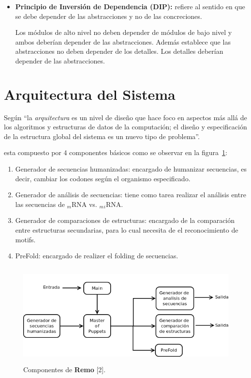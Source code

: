 \begin{itemize}
	\item \textbf{Principio de Inversión de Dependencia (DIP):} refiere al sentido en que se debe depender de las abstracciones y no de las concreciones.
	\par Los módulos de alto nivel no deben depender de módulos de bajo nivel y ambos deberían depender de las abstracciones. Además establece que las abstracciones no deben depender de los detalles. Los detalles deberían depender de las abstracciones. 
\end{itemize}

\section{Arquitectura del Sistema}
\par Según \cite{arquitecturaSistema} ``la \emph{arquitectura} es un nivel de diseño que hace foco en aspectos más allá de los algoritmos y estructuras de datos de la computación; el diseño y especificación de la estructura global del sistema es un nuevo tipo de problema''.

\par \remo esta compuesto por 4 componentes básicos como se observar en la figura~\ref{componentesBasicos}:

\begin{enumerate}
	\item Generador de secuencias humanizadas: encargado de humanizar secuencias, es decir, cambiar los codones según el organismo especificado.

	\item Generador de análisis de secuencias: tiene como tarea realizar el análisis entre las secuencias de $_m$RNA vs. $_m$$_i$RNA.

	\item Generador de comparaciones de estructuras: encargado de la comparación entre estructuras secundarias, para lo cual necesita de el reconocimiento de motifs.

	\item PreFold: encargado de realizer el folding de secuencias.

\end{enumerate}

\begin{figure}[!hbtp]
	\begin{center}
		\hspace*{.6cm}\includegraphics[width=12.5cm, height=5.2cm]{image/componenteRemo.png}
		\caption{Componentes de \textbf{Remo} [2].}
		\label{componentesBasicos}
	\end{center}
\end{figure}

